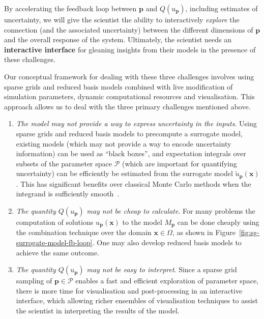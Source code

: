 \documentclass[a4paper,fontsize=12pt]{scrartcl}
\begin{document}
By accelerating the feedback loop between $\mathbf{p}$ and
$Q(u_{\mathbf{p}})$, including estimates of uncertainty, we will give
the scientist the ability to interactively \emph{explore} the
connection (and the associated uncertainty) between the different
dimensions of $\mathbf{p}$ and the overall response of the system.
Ultimately, the scientist needs an \textbf{interactive interface} for
gleaning insights from their models in the presence of these
challenges.

Our conceptual framework for dealing with these three challenges
involves using sparse grids and reduced basis models 
combined with live modification
of simulation parameters, dynamic computational resources and
visualisation. This approach allows us to deal with the three primary
challenges mentioned above.
\begin{enumerate}
\item \emph{The model may not provide a way to express uncertainty in
    the inputs}. Using sparse grids and reduced basis models to precompute
  a surrogate model, existing models (which may not
  provide a way to encode uncertainty information) can be used as
  ``black boxes'', and expectation integrals over subsets of the
  parameter space $\mathcal{P}$ (which are important for quantifying
  uncertainty) can be efficiently be estimated from the
  surrogate model $\tilde{u}_{\mathbf{p}}(\mathbf{x})$. This has
  significant benefits over classical Monte Carlo methods when the
  integrand is sufficiently
  smooth~\parencite{JakemanRoberts2013,FranzelinDiehlPfluger2014}.
\item \emph{The quantity $Q(u_{\mathbf{p}})$ may not be cheap to
    calculate}. For many problems the computation of solutions 
  $u_{\mathbf{p}}(\mathbf{x})$ to the model $M_{\mathbf{p}}$ can be done 
  cheaply using the combination technique over the domain
  $\mathbf{x}\in\Omega$, as shown in Figure~\ref{fig:sg-surrogate-model-fb-loop}.
  One may also develop reduced basis models to achieve the same outcome.
\item \emph{The quantity $Q(u_{\mathbf{p}})$ may not be easy to
    interpret}. Since a sparse grid sampling of $\mathbf{p}\in\mathcal{P}$ enables a fast 
  and efficient exploration of parameter space, there is more time for
  visualisation and post-processing in an interactive interface, which
  allowing richer ensembles of visualisation techniques to assist the
  scientist in interpreting the results of the model.
\end{enumerate}
\end{document}
